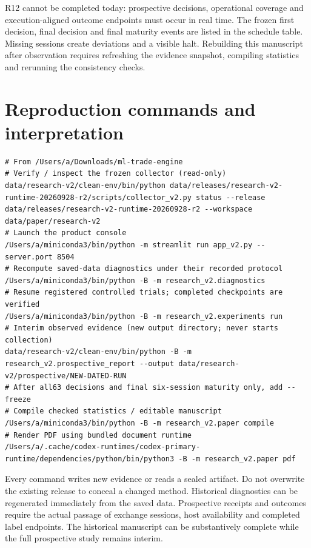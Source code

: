 \documentclass[11pt,a4paper]{article}
\begin{document}


R12 cannot be completed today: prospective decisions, operational coverage and execution-aligned outcome endpoints must occur in real time. The frozen first decision, final decision and final maturity events are listed in the schedule table. Missing sessions create deviations and a visible halt. Rebuilding this manuscript after observation requires refreshing the evidence snapshot, compiling statistics and rerunning the consistency checks.


\clearpage

\section{Reproduction commands and interpretation}\label{sec:appendix-c}

\begin{Verbatim}[breaklines=true,breakanywhere=true,fontsize=\scriptsize]
# From /Users/a/Downloads/ml-trade-engine
# Verify / inspect the frozen collector (read-only)
data/research-v2/clean-env/bin/python data/releases/research-v2-runtime-20260928-r2/scripts/collector_v2.py status --release data/releases/research-v2-runtime-20260928-r2 --workspace data/paper/research-v2
# Launch the product console
/Users/a/miniconda3/bin/python -m streamlit run app_v2.py --server.port 8504
# Recompute saved-data diagnostics under their recorded protocol
/Users/a/miniconda3/bin/python -B -m research_v2.diagnostics
# Resume registered controlled trials; completed checkpoints are verified
/Users/a/miniconda3/bin/python -B -m research_v2.experiments run
# Interim observed evidence (new output directory; never starts collection)
data/research-v2/clean-env/bin/python -B -m research_v2.prospective_report --output data/research-v2/prospective/NEW-DATED-RUN
# After all63 decisions and final six-session maturity only, add --freeze
# Compile checked statistics / editable manuscript
/Users/a/miniconda3/bin/python -B -m research_v2.paper compile
# Render PDF using bundled document runtime
/Users/a/.cache/codex-runtimes/codex-primary-runtime/dependencies/python/bin/python3 -B -m research_v2.paper pdf
\end{Verbatim}

Every command writes new evidence or reads a sealed artifact. Do not overwrite the existing release to conceal a changed method. Historical diagnostics can be regenerated immediately from the saved data. Prospective receipts and outcomes require the actual passage of exchange sessions, host availability and completed label endpoints. The historical manuscript can be substantively complete while the full prospective study remains interim.

\end{document}
